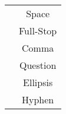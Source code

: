 \label{AlD:G}
\begin{tabular}{||c|c||}
\hline
\anglebracket	{\AlD{\whitespace}}	&	{Space}		\\
\anglebracket	{\AlD{.}}			&	{Full-Stop}	\\
\anglebracket	{\AlD{,}}			&	{Comma}		\\
\anglebracket	{\AlD{?}}			&	{Question}	\\
\anglebracket	{\AlD{...}}			&	{Ellipsis}	\\
\anglebracket	{\AlD{-}}			&	{Hyphen}	\\
\hline
\end{tabular}
